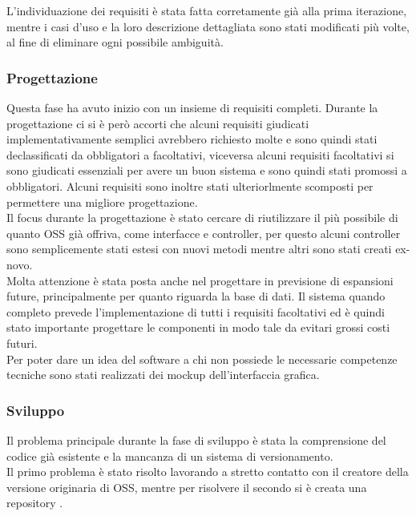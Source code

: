 L'individuazione dei requisiti è stata fatta corretamente già alla prima iterazione, mentre i casi d'uso e la loro descrizione dettagliata sono stati modificati più volte, al fine di eliminare ogni possibile ambiguità.
\subsubsection{Progettazione}
Questa fase ha avuto inizio con un insieme di requisiti completi. Durante la progettazione ci si è però accorti che alcuni requisiti giudicati implementativamente semplici avrebbero richiesto molte  e sono quindi stati declassificati da obbligatori a facoltativi, viceversa alcuni requisiti facoltativi si sono giudicati essenziali per avere un buon sistema e sono quindi stati promossi a obbligatori. Alcuni requisiti sono inoltre stati ulteriorlmente scomposti per permettere una migliore progettazione. \\

Il focus durante la progettazione è stato cercare di riutilizzare il più possibile di quanto OSS già offriva, come interfacce e controller, per questo alcuni controller sono semplicemente stati estesi con nuovi metodi mentre altri sono stati creati ex-novo.\\ 

Molta attenzione è stata posta anche nel progettare in previsione di espansioni future, principalmente per quanto riguarda la base di dati. Il sistema quando completo prevede l'implementazione di tutti i requisiti facoltativi ed è quindi stato importante progettare le componenti in modo tale da evitari grossi costi futuri.\\ 

Per poter dare un idea del software a chi non possiede le necessarie competenze tecniche sono stati realizzati dei mockup dell'interfaccia grafica.

\subsubsection{Sviluppo}
Il problema principale durante la fase di sviluppo è stata la comprensione del codice già esistente e la mancanza di un sistema di versionamento. \\

Il primo problema è stato risolto lavorando a stretto contatto con il creatore della versione originaria di OSS, mentre per risolvere il secondo si è creata una repository . \\


